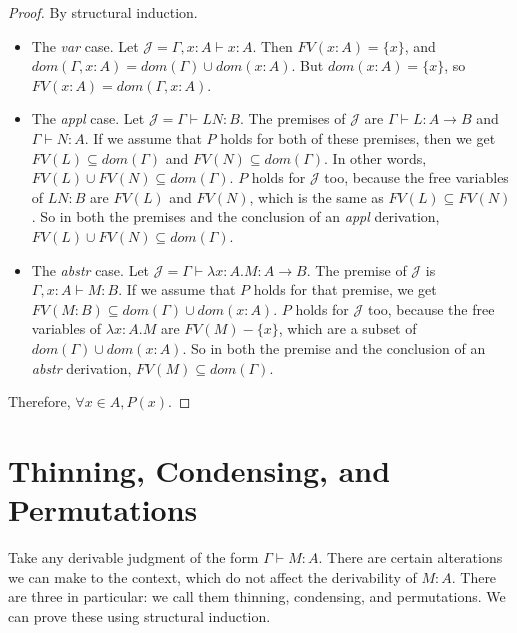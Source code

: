 \documentclass{book}
\numberwithin{equation}{chapter}
\begin{document}
\begin{proof}
By structural induction.

\begin{itemize}
\item{The \textit{var} case. Let $\mathcal{J} = \Gamma, x : A \vdash x : A$. Then $FV(x : A) = \{ x \}$, and $dom(\Gamma, x : A) = dom(\Gamma) \cup dom(x : A)$. But $dom(x : A) = \{ x \}$, so $FV(x : A) = dom(\Gamma, x : A)$.}

\item{The \textit{appl} case. Let $\mathcal{J} = \Gamma \vdash LN : B$. The premises of $\mathcal{J}$ are $\Gamma \vdash L : A \rightarrow B$ and $\Gamma \vdash N : A$. If we assume that $P$ holds for both of these premises, then we get $FV(L) \subseteq dom(\Gamma)$ and $FV(N) \subseteq dom(\Gamma)$. In other words, $FV(L) \cup FV(N) \subseteq dom(\Gamma)$. $P$ holds for $\mathcal{J}$ too, because the free variables of $LN : B$ are $FV(L)$ and $FV(N)$, which is the same as $FV(L) \subseteq FV(N)$. So in both the premises and the conclusion of an \textit{appl} derivation, $FV(L) \cup FV(N) \subseteq dom(\Gamma)$.}

\item{The \textit{abstr} case. Let $\mathcal{J} = \Gamma \vdash \lambda x : A.M : A \rightarrow B$. The premise of $\mathcal{J}$ is $\Gamma, x : A \vdash M : B$. If we assume that $P$ holds for that premise, we get $FV(M : B) \subseteq dom(\Gamma) \cup dom(x : A)$. $P$ holds for $\mathcal{J}$ too, because the free variables of $\lambda x : A.M$ are $FV(M) - \{ x \}$, which are a subset of $dom(\Gamma) \cup dom(x : A)$. So in both the premise and the conclusion of an \textit{abstr} derivation, $FV(M) \subseteq dom(\Gamma)$.}
\end{itemize}

\noindent
Therefore, $\forall x \in A, P(x)$.
\end{proof}

\noindent
\hrulefill
\newline


\chapter{Thinning, Condensing, and Permutations}

Take any derivable judgment of the form $\Gamma \vdash M : A$. There are certain alterations we can make to the context, which do not affect the derivability of $M : A$. There are three in particular: we call them thinning, condensing, and permutations. We can prove these using structural induction.
\end{document}
